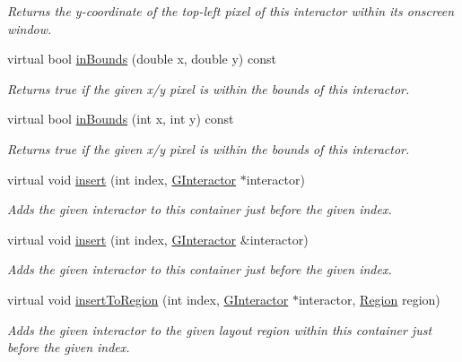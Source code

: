 \begin{DoxyCompactItemize}
\begin{DoxyCompactList}\small\item\em Returns the y-\/coordinate of the top-\/left pixel of this interactor within its onscreen window. \end{DoxyCompactList}\item 
virtual bool \mbox{\hyperlink{classGInteractor_afc480f652b8c5f1fb255e2269ce68879}{in\+Bounds}} (double x, double y) const
\begin{DoxyCompactList}\small\item\em Returns true if the given x/y pixel is within the bounds of this interactor. \end{DoxyCompactList}\item 
virtual bool \mbox{\hyperlink{classGInteractor_ae6d7982c1c627b677a5e776ca86118ed}{in\+Bounds}} (int x, int y) const
\begin{DoxyCompactList}\small\item\em Returns true if the given x/y pixel is within the bounds of this interactor. \end{DoxyCompactList}\item 
virtual void \mbox{\hyperlink{classGContainer_afffb8f789ff9a8466fbae5b846a0ebe7}{insert}} (int index, \mbox{\hyperlink{classGInteractor}{G\+Interactor}} $\ast$interactor)
\begin{DoxyCompactList}\small\item\em Adds the given interactor to this container just before the given index. \end{DoxyCompactList}\item 
virtual void \mbox{\hyperlink{classGContainer_a2e9d7c6d9e6769d4cfd3293afe7e215c}{insert}} (int index, \mbox{\hyperlink{classGInteractor}{G\+Interactor}} \&interactor)
\begin{DoxyCompactList}\small\item\em Adds the given interactor to this container just before the given index. \end{DoxyCompactList}\item 
virtual void \mbox{\hyperlink{classGContainer_a1c4b766b059991ad7d084ea03f22f1c5}{insert\+To\+Region}} (int index, \mbox{\hyperlink{classGInteractor}{G\+Interactor}} $\ast$interactor, \mbox{\hyperlink{classGContainer_a81a01a86de31071a92e6cce0bab9bc4b}{Region}} region)
\begin{DoxyCompactList}\small\item\em Adds the given interactor to the given layout region within this container just before the given index. \end{DoxyCompactList}\item 

\end{DoxyCompactItemize}
